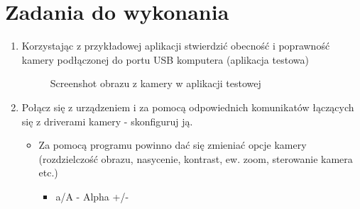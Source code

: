 \documentclass[a4paper,12pt]{extarticle}  %
\begin{document}
\section{Zadania do wykonania}
\begin{enumerate}
	\item Korzystając z przykładowej aplikacji stwierdzić obecność i poprawność kamery podłączonej do portu USB komputera (aplikacja testowa)
	      \begin{figure}[H]
		      \centering
			  \caption{Screenshot obrazu z kamery w aplikacji testowej}
	      \end{figure}
	\item Połącz się z urządzeniem i za pomocą odpowiednich komunikatów łączących się z driverami kamery - skonfiguruj ją.
	      \begin{itemize}
		      \item Za pomocą programu powinno dać się zmieniać opcje kamery (rozdzielczość obrazu, nasycenie, kontrast, ew. zoom, sterowanie kamera etc.)
\begin{itemize}
	\item a/A - Alpha +/-

\end{itemize}
\end{itemize}
\end{enumerate}
\end{document}
